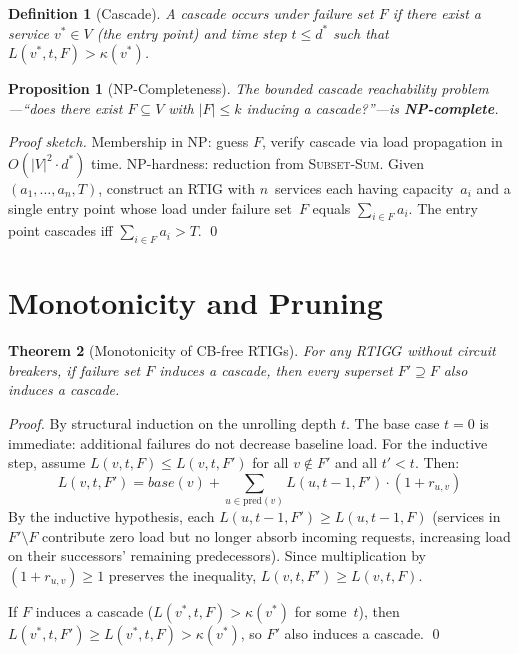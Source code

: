 \documentclass[10pt,twocolumn]{article}
\newcommand{\rtig}{RTIG\xspace}
\newtheorem{theorem}{Theorem}
\newtheorem{definition}{Definition}
\newtheorem{proposition}[theorem]{Proposition}
\begin{document}
\begin{definition}[Cascade]
A \emph{cascade} occurs under failure set $F$ if there exist a service
$v^* \in V$ (the entry point) and time step $t \le d^*$ such that
$L(v^*, t, F) > \kappa(v^*)$.
\end{definition}

\begin{proposition}[NP-Completeness]
\label{thm:npcomplete}
The bounded cascade reachability problem---``does there exist $F \subseteq V$
with $|F| \le k$ inducing a cascade?''---is \textbf{NP-complete}.
\end{proposition}

\begin{proof}[Proof sketch]
Membership in NP: guess $F$, verify cascade via load propagation in
$O(|V|^2 \cdot d^*)$ time. NP-hardness: reduction from \textsc{Subset-Sum}.
Given $(a_1, \ldots, a_n, T)$, construct an \rtig with $n$~services each
having capacity~$a_i$ and a single entry point whose load under failure set~$F$
equals $\sum_{i \in F} a_i$. The entry point cascades iff
$\sum_{i \in F} a_i > T$. \qed
\end{proof}

\section{Monotonicity and Pruning}
\label{sec:monotone}

\begin{theorem}[Monotonicity of CB-free RTIGs]
\label{thm:monotone}
For any \rtig $G$ without circuit breakers, if failure set $F$ induces a
cascade, then every superset $F' \supseteq F$ also induces a cascade.
\end{theorem}

\begin{proof}
By structural induction on the unrolling depth $t$. The base case
$t=0$ is immediate: additional failures do not decrease baseline load.
For the inductive step, assume $L(v, t, F) \le L(v, t, F')$ for all
$v \notin F'$ and all $t' < t$. Then:
\[
L(v, t, F') = \mathit{base}(v) + \sum_{u \in \mathrm{pred}(v)}
  L(u, t{-}1, F') \cdot (1 + r_{u,v})
\]
By the inductive hypothesis, each $L(u, t{-}1, F') \ge L(u, t{-}1, F)$
(services in $F' \setminus F$ contribute zero load but no longer absorb
incoming requests, increasing load on their successors' remaining
predecessors). Since multiplication by $(1 + r_{u,v}) \ge 1$ preserves the
inequality, $L(v, t, F') \ge L(v, t, F)$.

If $F$ induces a cascade ($L(v^*, t, F) > \kappa(v^*)$ for some~$t$), then
$L(v^*, t, F') \ge L(v^*, t, F) > \kappa(v^*)$, so $F'$ also induces a
cascade. \qed
\end{proof}
\end{document}
